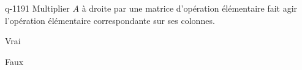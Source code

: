 \begin{truefalse}{q-1191}
Multiplier $A$ à droite par une matrice d'opération élémentaire fait agir l'opération élémentaire correspondante sur ses colonnes. 
\item* Vrai
\item Faux
\end{truefalse}

